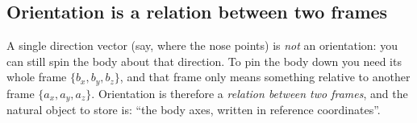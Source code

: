 \subsection{Orientation is a relation between two frames}\label{sec:rot:orientation-relation-between}
A single direction vector (say, where the nose points) is \emph{not} an orientation: you can still spin the body about that direction. To pin the body down you need its whole frame $\{b_x,b_y,b_z\}$, and that frame only means something relative to another frame $\{a_x,a_y,a_z\}$. Orientation is therefore a \emph{relation between two frames}, and the natural object to store is: ``the body axes, written in reference coordinates''.
